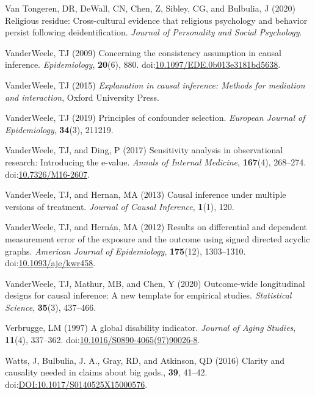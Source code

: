 \documentclass[
  single column]{article}
\newlength{\cslhangindent}
\newenvironment{CSLReferences}[2] %
 {\begin{list}{}{%
  \setlength{\itemindent}{0pt}
  \setlength{\leftmargin}{0pt}
  \setlength{\parsep}{0pt}
  \ifodd #1
   \setlength{\leftmargin}{\cslhangindent}
   \setlength{\itemindent}{-1\cslhangindent}
  \fi
  \setlength{\itemsep}{#2\baselineskip}}}
 {\end{list}}
\begin{document}
\begin{CSLReferences}{1}{0}
Van Tongeren, DR, DeWall, CN, Chen, Z, Sibley, CG, and Bulbulia, J
(2020) Religious residue: Cross-cultural evidence that religious
psychology and behavior persist following deidentification.
\emph{Journal of Personality and Social Psychology}.

VanderWeele, TJ (2009) Concerning the consistency assumption in causal
inference. \emph{Epidemiology}, \textbf{20}(6), 880.
doi:\href{https://doi.org/10.1097/EDE.0b013e3181bd5638}{10.1097/EDE.0b013e3181bd5638}.

VanderWeele, TJ (2015) \emph{Explanation in causal inference: Methods
for mediation and interaction}, Oxford University Press.

VanderWeele, TJ (2019) Principles of confounder selection.
\emph{European Journal of Epidemiology}, \textbf{34}(3), 211219.

VanderWeele, TJ, and Ding, P (2017) Sensitivity analysis in
observational research: Introducing the e-value. \emph{Annals of
Internal Medicine}, \textbf{167}(4), 268--274.
doi:\href{https://doi.org/10.7326/M16-2607}{10.7326/M16-2607}.

VanderWeele, TJ, and Hernan, MA (2013) Causal inference under multiple
versions of treatment. \emph{Journal of Causal Inference},
\textbf{1}(1), 120.

VanderWeele, TJ, and Hernán, MA (2012) Results on differential and
dependent measurement error of the exposure and the outcome using signed
directed acyclic graphs. \emph{American Journal of Epidemiology},
\textbf{175}(12), 1303--1310.
doi:\href{https://doi.org/10.1093/aje/kwr458}{10.1093/aje/kwr458}.

VanderWeele, TJ, Mathur, MB, and Chen, Y (2020) Outcome-wide
longitudinal designs for causal inference: A new template for empirical
studies. \emph{Statistical Science}, \textbf{35}(3), 437--466.

Verbrugge, LM (1997) A global disability indicator. \emph{Journal of
Aging Studies}, \textbf{11}(4), 337--362.
doi:\href{https://doi.org/10.1016/S0890-4065(97)90026-8}{10.1016/S0890-4065(97)90026-8}.

Watts, J, Bulbulia, J. A., Gray, RD, and Atkinson, QD (2016) Clarity and
causality needed in claims about big gods., \textbf{39}, 41--42.
doi:\href{https://doi.org/DOI:10.1017/S0140525X15000576}{DOI:10.1017/S0140525X15000576}.


\end{CSLReferences}
\end{document}
